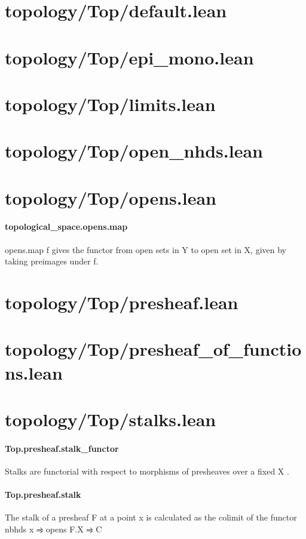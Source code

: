 \documentclass{article}
\begin{document}
\section{topology/Top/default.lean}\section{topology/Top/epi\_mono.lean}\section{topology/Top/limits.lean}\section{topology/Top/open\_nhds.lean}\section{topology/Top/opens.lean}\paragraph{topological\_space.opens.map}
\par
\colorbox[RGB]{253,246,227}{{{{\color[RGB]{101, 123, 131} opens.map f }}}} gives the functor from open sets in Y to open set in X,
given by taking preimages under f.
\section{topology/Top/presheaf.lean}\section{topology/Top/presheaf\_of\_functions.lean}\section{topology/Top/stalks.lean}\paragraph{Top.presheaf.stalk\_functor}
\par
Stalks are functorial with respect to morphisms of presheaves over a fixed 
\colorbox[RGB]{253,246,227}{{{{\color[RGB]{101, 123, 131} X }}}}.
\paragraph{Top.presheaf.stalk}
\par
The stalk of a presheaf 
\colorbox[RGB]{253,246,227}{{{{\color[RGB]{101, 123, 131} F }}}} at a point 
\colorbox[RGB]{253,246,227}{{{{\color[RGB]{101, 123, 131} x }}}} is calculated as the colimit of the functor
nbhds x ⥤ opens F.X ⥤ C
\end{document}
